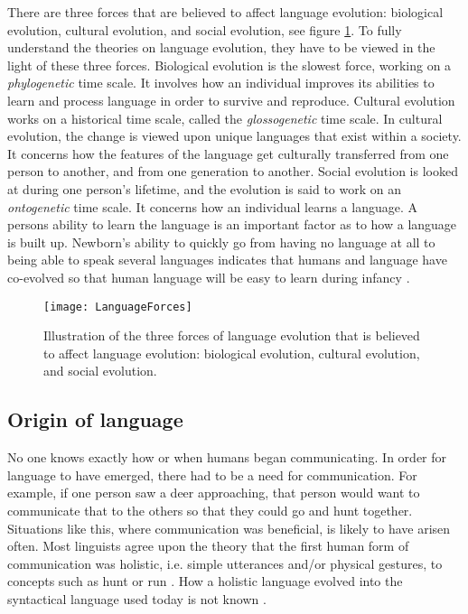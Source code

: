 There are three forces that are believed to affect language evolution: biological evolution, cultural evolution, and social evolution, see figure \ref{fig:LanguageForces}. To fully understand the theories on language evolution, they have to be viewed in the light of these three forces.
Biological evolution is the slowest force, working on a \textit{phylogenetic} time scale. It involves how an individual improves its abilities to learn and process language in order to survive and reproduce.
Cultural evolution works on a historical time scale, called the \textit{glossogenetic} time scale. In cultural evolution, the change is viewed upon unique languages that exist within a society. It concerns how the features of the language get culturally transferred from one person to another, and from one generation to another.
Social evolution is looked at during one person's lifetime, and the evolution is said to work on an \textit{ontogenetic} time scale. It concerns how an individual learns a language. A persons ability to learn the language is an important factor as to how a language is built up. Newborn's ability to quickly go from having no language at all to being able to speak several languages indicates that humans and language have co-evolved so that human language will be easy to learn during infancy \citep{tomasello2003makes}.

\begin{figure}[ht]
    \centering
    \texttt{[image: LanguageForces]}
    \caption[Illustration of the three forces of language evolution.]{Illustration of the three forces of language evolution that is believed to affect language evolution: biological evolution, cultural evolution, and social evolution.}
    \label{fig:LanguageForces}
\end{figure}

\subsection{Origin of language}
No one knows exactly how or when humans began communicating. In order for language to have emerged, there had to be a need for communication. For example, if one person saw a deer approaching, that person would want to communicate that to the others so that they could go and hunt together. Situations like this, where communication was beneficial, is likely to have arisen often. Most linguists agree upon the theory that the first human form of communication was holistic, i.e. simple utterances and/or physical gestures, to concepts such as hunt or run \citep{christiansen2003language}. How a holistic language evolved into the syntactical language used today is not known \citep{bickerton2007language}.

